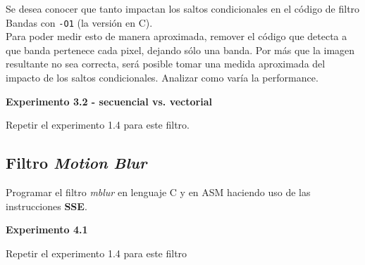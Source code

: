 Se desea conocer que tanto impactan los saltos condicionales en el código 
de filtro Bandas con \verb|-O1| (la versión en C).\\
Para poder medir esto de manera aproximada, remover el código
que detecta a que banda pertenece cada pixel, dejando
sólo una banda.
Por más que la imagen resultante no sea correcta, será posible tomar una
medida aproximada del impacto de los saltos condicionales.
Analizar como varía la performance. 

\vspace*{0.3cm} \noindent
\textbf{Experimento 3.2 - secuencial vs. vectorial}

Repetir el experimento 1.4 para este filtro.


\subsection*{Filtro \textit{Motion Blur}}
Programar el filtro \textit{mblur} en lenguaje C y en ASM haciendo uso de 
las instrucciones \textbf{SSE}.

\vspace*{0.3cm} \noindent
\textbf{Experimento 4.1}

Repetir el experimento 1.4 para este filtro
